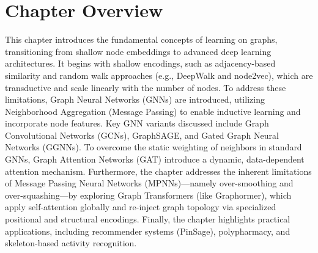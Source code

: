 \section{Chapter Overview}

This chapter introduces the fundamental concepts of learning on graphs, transitioning from shallow node embeddings to advanced deep learning architectures. It begins with shallow encodings, such as adjacency-based similarity and random walk approaches (e.g., DeepWalk and node2vec), which are transductive and scale linearly with the number of nodes. To address these limitations, Graph Neural Networks (GNNs) are introduced, utilizing Neighborhood Aggregation (Message Passing) to enable inductive learning and incorporate node features. Key GNN variants discussed include Graph Convolutional Networks (GCNs), GraphSAGE, and Gated Graph Neural Networks (GGNNs). To overcome the static weighting of neighbors in standard GNNs, Graph Attention Networks (GAT) introduce a dynamic, data-dependent attention mechanism. Furthermore, the chapter addresses the inherent limitations of Message Passing Neural Networks (MPNNs)—namely over-smoothing and over-squashing—by exploring Graph Transformers (like Graphormer), which apply self-attention globally and re-inject graph topology via specialized positional and structural encodings. Finally, the chapter highlights practical applications, including recommender systems (PinSage), polypharmacy, and skeleton-based activity recognition.

